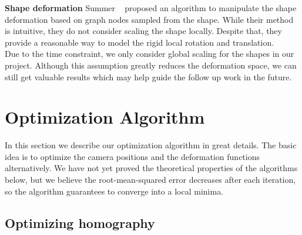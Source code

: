 \documentclass[10pt,twocolumn,letterpaper]{article}
\begin{document}
\noindent
\textbf{Shape deformation} Summer \etal~\cite{sumner2007embedded} proposed an algorithm to manipulate the shape deformation based on graph nodes sampled from the shape. While their method is intuitive, they do not consider scaling the shape locally. Despite that, they provide a reasonable way to model the rigid local rotation and translation.\\

\noindent
Due to the time constraint, we only consider global scaling for the shapes in our project. Although this assumption greatly reduces the deformation space, we can still get valuable results which may help guide the follow up work in the future.

\section{Optimization Algorithm}

\noindent
In this section we describe our optimization algorithm in great details. The basic idea is to optimize the camera positions and the deformation functions alternatively. We have not yet proved the theoretical properties of the algorithms below, but we believe the root-mean-squared error decreases after each iteration, so the algorithm guarantees to converge into a local minima.

\subsection{Optimizing homography}
\end{document}
